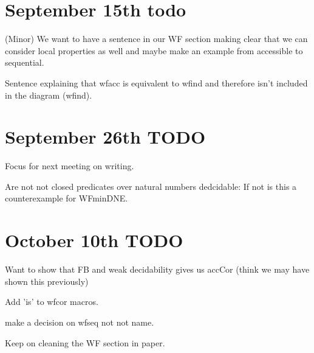 \documentclass{article}
\newcommand{\cmark}{\ding{51}}%
\newcommand{\done}{\rlap{$\square$}{\raisebox{2pt}{\large\hspace{1pt}\cmark}}%
\hspace{-2.5pt}}
\begin{document}
\section*{September 15th todo}
\begin{todolist}
  \item (Minor) We want to have a sentence in our WF section making clear that we can consider local properties as well and maybe make an example from accessible to sequential. 
  \item Sentence explaining that wfacc is equivalent to wfind and therefore isn't included in the diagram (wfind).
\end{todolist}

\section*{September 26th TODO}
\begin{todolist}     
  \item Focus for next meeting on writing. 
  \item [\done] Are not not closed predicates over natural numbers dedcidable: If not is this a counterexample for WFminDNE.
\end{todolist}

\section*{October 10th TODO}
\begin{todolist}     
  \item Want to show that FB and weak decidability gives us accCor (think we may have shown this previously)
  \item Add 'is' to wfcor macros.
  \item make a decision on wfseq not not name. 
  \item Keep on cleaning the WF section in paper. 
  \item 
\end{todolist}
\end{document}
